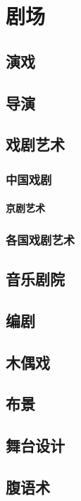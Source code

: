 \documentclass[UTF8]{../RepresentationUniverse}
\begin{document}
\chapter{剧场}
\section{演戏}
\section{导演}
\section{戏剧艺术}
    \subsection{中国戏剧}
        \subsubsection{京剧艺术}

    \subsection{各国戏剧艺术}


\section{音乐剧院}
\section{编剧}
\section{木偶戏}
\section{布景}
\section{舞台设计}
\section{腹语术}
\end{document}
